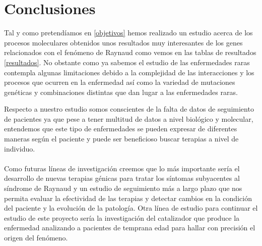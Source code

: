 \section{Conclusiones}

Tal y como pretendíamos en \ref{objetivos} hemos realizado un estudio acerca de los procesos moleculares obtenidos unos resultados muy interesantes de los genes relacionados con el fenómeno de Raynaud como vemos en las tablas de resultados \ref{resultados}. No obstante como ya sabemos el estudio de las enfermedades raras contempla algunas limitaciones debido a la complejidad de las interacciones y los procesos que ocurren en la enfermedad así como la variedad de mutaciones genéticas y combinaciones distintas que dan lugar a las enfermedades raras.

Respecto a nuestro estudio somos conscientes de la falta de datos de seguimiento de pacientes ya que pese a tener multitud de datos a nivel biológico y molecular, entendemos que este tipo de enfermedades se pueden expresar de diferentes maneras según el paciente y puede ser beneficioso buscar terapias a nivel de individuo. \\
\\
Como futuras líneas de investigación creemos que lo más importante sería el desarrollo de nuevas terapias génicas para tratar los síntomas subyacentes al síndrome de Raynaud y un estudio de seguimiento más a largo plazo que nos permita evaluar la efectividad de las terapias y detectar cambios en la condición del paciente y la evolución de la patología. Otra línea de estudio para continuar el estudio de este proyecto sería la investigación del catalizador que produce la enfermedad analizando a pacientes de temprana edad para hallar con precisión el origen del fenómeno.